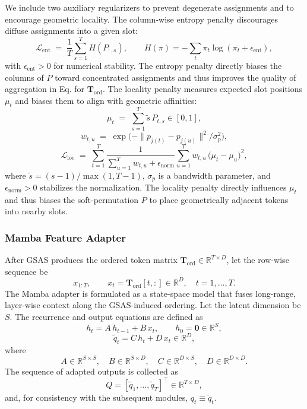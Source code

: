 We include two auxiliary regularizers to prevent degenerate assignments and to encourage geometric locality. The column-wise entropy penalty discourages diffuse assignments into a given slot:
\begin{equation}
\mathcal{L}_{\mathrm{ent}} \;=\; \frac{1}{T}\sum_{s=1}^T H(P_{:,s}),\qquad
H(\pi)=-\sum_{t}\pi_t\log(\pi_t+\epsilon_{\mathrm{ent}}),
\end{equation}
with \(\epsilon_{\mathrm{ent}}>0\) for numerical stability. The entropy penalty directly biases the columns of \(P\) toward concentrated assignments and thus improves the quality of aggregation in Eq. for \(\mathbf{T}_{\mathrm{ord}}\). The locality penalty measures expected slot positions \(\mu_t\) and biases them to align with geometric affinities:
\begin{equation}
\mu_t \;=\; \sum_{s=1}^T \tilde s\,P_{t,s}\in[0,1],
\end{equation}
\begin{equation}
w_{t,u} \;=\; \exp\!\big(-\|p_{j(t)}-p_{j(u)}\|^2/\sigma_p^2\big),
\end{equation}
\begin{equation}
\mathcal{L}_{\mathrm{loc}} \;=\; \sum_{t=1}^T \frac{1}{\sum_{u=1}^T w_{t,u} + \epsilon_{\mathrm{norm}}}\sum_{u=1}^T w_{t,u}\,\big(\mu_t - \mu_u\big)^2,
\end{equation}
where \(\tilde s=(s-1)/\max(1,T-1)\), \(\sigma_p\) is a bandwidth parameter, and \(\epsilon_{\mathrm{norm}}>0\) stabilizes the normalization. The locality penalty directly influences \(\mu_t\) and thus biases the soft-permutation \(P\) to place geometrically adjacent tokens into nearby slots.

\subsubsection{Mamba Feature Adapter}

After GSAS produces the ordered token matrix $\mathbf{T}_{\mathrm{ord}}\in\mathbb{R}^{T\times D}$, let the row-wise sequence be
$$
x_{1:T},\qquad x_t=\mathbf{T}_{\mathrm{ord}}[t,:]\in\mathbb{R}^D,\quad t=1,\dots,T.
$$
The Mamba adapter is formulated as a state-space model that fuses long-range, layer-wise context along the GSAS-induced ordering. Let the latent dimension be $S$. The recurrence and output equations are defined as
\begin{equation}
h_t = A\,h_{t-1} + B\,x_t,\qquad h_0=\mathbf{0}\in\mathbb{R}^S,
\end{equation}
\begin{equation}
\tilde{q}_t = C\,h_t + D\,x_t \in\mathbb{R}^D,
\end{equation}
where
$$
A\in\mathbb{R}^{S\times S},\quad 
B\in\mathbb{R}^{S\times D},\quad 
C\in\mathbb{R}^{D\times S},\quad 
D\in\mathbb{R}^{D\times D}.
$$
The sequence of adapted outputs is collected as
$$
Q=[\tilde{q}_1,\dots,\tilde{q}_T]^\top\in\mathbb{R}^{T\times D},
$$
and, for consistency with the subsequent modules, $q_t\equiv\tilde{q}_t$.

